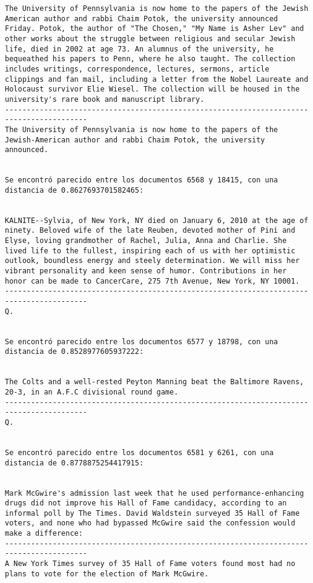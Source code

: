\documentclass[11pt]{article}
\begin{document}
\begin{Verbatim}[commandchars=\\\{\}]
The University of Pennsylvania is now home to the papers of the Jewish American author and rabbi Chaim Potok, the university announced Friday. Potok, the author of "The Chosen," "My Name is Asher Lev" and other works about the struggle between religious and secular Jewish life, died in 2002 at age 73. An alumnus of the university, he bequeathed his papers to Penn, where he also taught. The collection includes writings, correspondence, lectures, sermons, article clippings and fan mail, including a letter from the Nobel Laureate and Holocaust survivor Elie Wiesel. The collection will be housed in the university's rare book and manuscript library.
-----------------------------------------------------------------------------------------
The University of Pennsylvania is now home to the papers of the Jewish-American author and rabbi Chaim Potok, the university announced.


Se encontró parecido entre los documentos 6568 y 18415, con una distancia de 0.8627693701582465:


KALNITE--Sylvia, of New York, NY died on January 6, 2010 at the age of ninety. Beloved wife of the late Reuben, devoted mother of Pini and Elyse, loving grandmother of Rachel, Julia, Anna and Charlie. She lived life to the fullest, inspiring each of us with her optimistic outlook, boundless energy and steely determination. We will miss her vibrant personality and keen sense of humor. Contributions in her honor can be made to CancerCare, 275 7th Avenue, New York, NY 10001.
-----------------------------------------------------------------------------------------
Q.


Se encontró parecido entre los documentos 6577 y 18798, con una distancia de 0.8528977605937222:


The Colts and a well-rested Peyton Manning beat the Baltimore Ravens, 20-3, in an A.F.C divisional round game.
-----------------------------------------------------------------------------------------
Q.


Se encontró parecido entre los documentos 6581 y 6261, con una distancia de 0.8778875254417915:


Mark McGwire's admission last week that he used performance-enhancing drugs did not improve his Hall of Fame candidacy, according to an informal poll by The Times. David Waldstein surveyed 35 Hall of Fame voters, and none who had bypassed McGwire said the confession would make a difference:
-----------------------------------------------------------------------------------------
A New York Times survey of 35 Hall of Fame voters found most had no plans to vote for the election of Mark McGwire.



\end{Verbatim}
\end{document}
